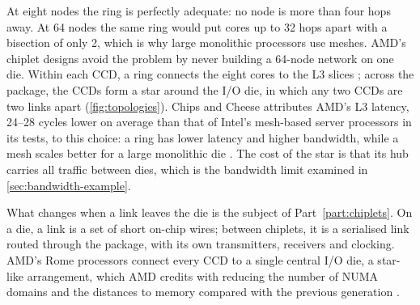 At eight nodes the ring is perfectly adequate: no node is more than four hops away. At 64 nodes the same ring would put cores up to 32 hops apart with a bisection of only 2, which is why large monolithic processors use meshes. AMD's chiplet designs avoid the problem by never building a 64-node network on one die. Within each CCD, a ring connects the eight cores to the L3 slices \cite{lamAMDs7950X3DZen2023}; across the package, the CCDs form a star around the I/O die, in which any two CCDs are two links apart (\cref{fig:topologies}). Chips and Cheese attributes AMD's L3 latency, 24--28 cycles lower on average than that of Intel's mesh-based server processors in its tests, to this choice: a ring has lower latency and higher bandwidth, while a mesh scales better for a large monolithic die \cite{cozmaDeepDivingZen2022}. The cost of the star is that its hub carries all traffic between dies, which is the bandwidth limit examined in \cref{sec:bandwidth-example}.



What changes when a link leaves the die is the subject of Part~\ref{part:chiplets}. On a die, a link is a set of short on-chip wires; between chiplets, it is a serialised link routed through the package, with its own transmitters, receivers and clocking. AMD's Rome processors connect every CCD to a single central I/O die, a star-like arrangement, which AMD credits with reducing the number of NUMA domains and the distances to memory compared with the previous generation \cite{naffziger2020chiplet}.
